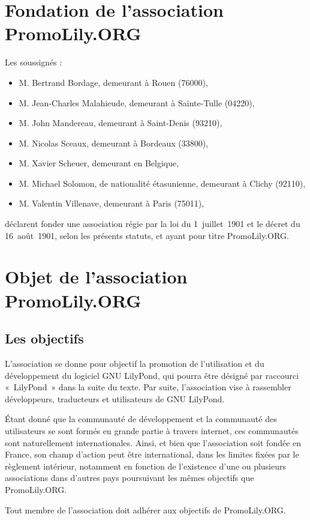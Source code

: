\documentclass[a4wide,12pt]{scrartcl}
\newcommand{\nomAssoc}{PromoLily.ORG\xspace}
\begin{document}
\section{Fondation de l'association \nomAssoc}

Les soussignés :
\begin{itemize}
\item M. Bertrand Bordage, demeurant à Rouen (76000),
\item M. Jean-Charles Malahieude, demeurant à Sainte-Tulle (04220),
\item M. John Mandereau, demeurant à Saint-Denis (93210),
\item M. Nicolas Sceaux, demeurant à Bordeaux (33800),
\item M. Xavier Scheuer, demeurant en Belgique,
\item M. Michael Solomon, de nationalité étasunienne,
  demeurant à Clichy (92110),
\item M. Valentin Villenave, demeurant à Paris (75011),
\end{itemize}
déclarent fonder une association régie par la loi du 1\ier{}~juillet~1901
et le décret du 16~août~1901, selon les présents statuts, et ayant
pour titre \nomAssoc.


\section{Objet de l'association \nomAssoc}

\subsection{Les objectifs}

L'association se donne pour objectif la promotion de l'utilisation et
du développement du logiciel GNU LilyPond, qui pourra être désigné par
raccourci «~LilyPond~» dans la suite du texte. Par suite,
l’association vise à rassembler développeurs, traducteurs et
utilisateurs de GNU LilyPond.

Étant donné que la communauté de développement et la communauté des
utilisateurs se sont formés en grande partie à travers internet, ces
communautés sont naturellement internationales. Ainsi, et bien que
l'association soit fondée en France, son champ d'action peut être
international, dans les limites fixées par le règlement intérieur,
notamment en fonction de l'existence d'une ou plusieurs associations
dans d'autres pays poursuivant les mêmes objectifs que \nomAssoc.

Tout membre de l'association doit adhérer aux objectifs de \nomAssoc.
\end{document}
